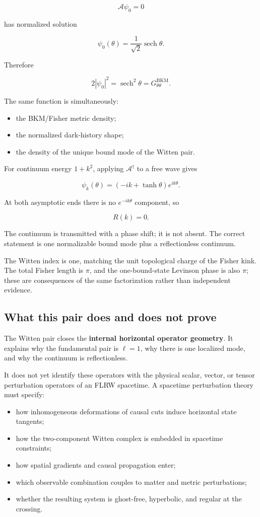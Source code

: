 \documentclass[
  11pt,
  letterpaper,
]{article}
\providecommand{\tightlist}{%
  \setlength{\itemsep}{0pt}\setlength{\parskip}{0pt}}
\begin{document}
\[
\mathcal A\psi_0=0
\]

has normalized solution

\[
\boxed{
\psi_0(\theta)=\frac1{\sqrt2}\operatorname{sech}\theta.
}
\]

Therefore

\[
\boxed{
2|\psi_0|^2=\operatorname{sech}^2\theta=G^{\mathrm{BKM}}_{\theta\theta}.
}
\]

The same function is simultaneously:

\begin{itemize}
\tightlist
\item
  the BKM/Fisher metric density;
\item
  the normalized dark-history shape;
\item
  the density of the unique bound mode of the Witten pair.
\end{itemize}

For continuum energy \(1+k^2\), applying \(\mathcal A^\dagger\) to a
free wave gives

\[
\psi_k(\theta)=(-ik+\tanh\theta)e^{ik\theta}.
\]

At both asymptotic ends there is no \(e^{-ik\theta}\) component, so

\[
\boxed{R(k)=0.}
\]

The continuum is transmitted with a phase shift; it is not absent. The
correct statement is one normalizable bound mode plus a reflectionless
continuum.

The Witten index is one, matching the unit topological charge of the
Fisher kink. The total Fisher length is \(\pi\), and the one-bound-state
Levinson phase is also \(\pi\); these are consequences of the same
factorization rather than independent evidence.

\subsection{What this pair does and does not
prove}\label{what-this-pair-does-and-does-not-prove}

The Witten pair closes the \textbf{internal horizontal operator
geometry}. It explains why the fundamental pair is \(\ell=1\), why there
is one localized mode, and why the continuum is reflectionless.

It does not yet identify these operators with the physical scalar,
vector, or tensor perturbation operators of an FLRW spacetime. A
spacetime perturbation theory must specify:

\begin{itemize}
\tightlist
\item
  how inhomogeneous deformations of causal cuts induce horizontal state
  tangents;
\item
  how the two-component Witten complex is embedded in spacetime
  constraints;
\item
  how spatial gradients and causal propagation enter;
\item
  which observable combination couples to matter and metric
  perturbations;
\item
  whether the resulting system is ghost-free, hyperbolic, and regular at
  the crossing.
\end{itemize}
\end{document}
